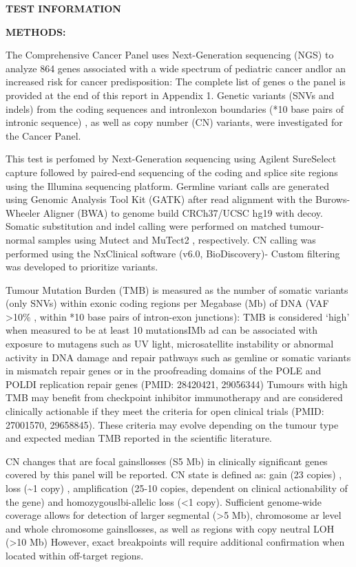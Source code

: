 \documentclass[8pt,letterpaper]{extarticle}
\begin{document}
\vspace{2em}
{\small
{\bf TEST INFORMATION}

{\bf METHODS:}

The Comprehensive Cancer Panel uses Next-Generation sequencing (NGS) to analyze 864 genes associated with a wide spectrum of pediatric cancer andlor an increased risk for cancer predisposition: The complete list of genes o the panel is provided at the end of this report in Appendix 1. Genetic variants (SNVs and indels) from the coding sequences and intronlexon boundaries (*10 base pairs of intronic sequence) , as well as copy number (CN) variants, were investigated for the Cancer Panel.

This test is perfomed by Next-Generation sequencing using Agilent SureSelect capture followed by paired-end sequencing of the coding and splice site regions using the Illumina sequencing platform. Germline variant calls are generated using Genomic Analysis Tool Kit (GATK) after read alignment with the Burows-Wheeler Aligner (BWA) to genome build CRCh37/UCSC hg19 with decoy. Somatic substitution and indel calling were performed on matched tumour-normal samples using Mutect and MuTect2 , respectively. CN calling was performed using the NxClinical software (v6.0, BioDiscovery)- Custom filtering was developed to prioritize variants. 

Tumour Mutation Burden (TMB) is measured as the number of somatic variants (only SNVs) within exonic coding regions per Megabase (Mb) of DNA (VAF >10\% , within *10 base pairs of intron-exon junctions): TMB is considered `high' when measured to be at least 10 mutationsIMb ad can be associated with exposure to mutagens such as UV light, microsatellite instability or abnormal activity in DNA damage and repair pathways such as gemline or somatic variants in mismatch repair genes or in the proofreading domains of the POLE and POLDI replication repair genes (PMID: 28420421, 29056344) Tumours with high TMB may benefit from checkpoint inhibitor immunotherapy and are considered clinically actionable if they meet the criteria for open clinical trials (PMID: 27001570, 29658845). These criteria may evolve depending on the tumour type and expected median TMB reported in the scientific literature.

CN changes that are focal gainsllosses (S5 Mb) in clinically significant genes covered by this panel will be reported. CN state is defined as: gain (23 copies) , loss (\textasciitilde 1 copy) , amplification (25-10 copies, dependent on clinical actionability of the gene) and homozygouslbi-allelic loss (<1 copy). Sufficient genome-wide coverage allows for detection of larger segmental (>5 Mb), chromosome ar level and whole chromosome gainsllosses, as well as regions with copy neutral LOH (>10 Mb)  However, exact breakpoints will require additional confirmation when located within off-target regions.

}
\end{document}
